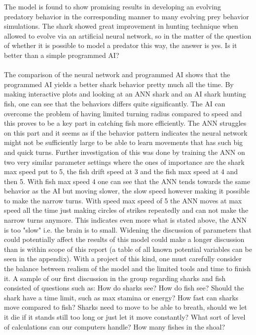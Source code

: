 The model is found to show promising results in developing an evolving predatory
behavior in the corresponding manner to many evolving prey behavior
simulations. The shark showed great improvement in hunting technique when
allowed to evolve via an artificial neural network, so in the matter of the question of whether it is possible to model a predator this way, the answer is yes. Is it better than a simple programmed AI?\\
\\
The comparison of the neural network and programmed AI shows that the
programmed AI yields a better shark behavior pretty much all the time. By making interactive plots and looking at an ANN shark and an AI shark hunting fish, one can see that the behaviors differs quite significantly. The AI can overcome the problem of having limited turning radius compared to speed and this proves to be a key part in catching fish more efficiently. The ANN struggles on this part and it seems as if the behavior pattern indicates the neural network might not be sufficiently large to be able to learn movements that has such big and quick turns. Further investigation of this was done by training the ANN on two very similar parameter settings where the ones of importance are the shark max speed put to 5, the fish drift speed at 3 and the fish max speed at 4 and then 5. With fish max speed 4 one can see that the ANN tends towards the same behavior as the AI but moving slower, the slow speed however making it possible to make the narrow turns. With speed max speed of 5 the ANN moves at max speed all the time just making circles of strikes repeatedly and can not make the narrow turns anymore. This indicates even more what is stated above, the ANN is too "slow" i.e. the brain is to small.
Widening the discussion of parameters that could potentially affect the results of this model could make a longer discussion than is within scope of this report (a table of all known potential variables can be seen in the appendix). With a project of this kind, one must carefully consider the balance between realism of the model and the limited tools and time to finish it. A sample of our first discussion in the group regarding sharks and fish consisted of questions such as: How do sharks see? How do fish see? Should the shark have a time limit, such as max stamina or energy? How fast can sharks move compared to fish? Sharks need to move to be able to breath, should we let it die if it stands still too long or just let it move constantly? What sort of level of calculations can our computers handle? How many fishes in the shoal?
